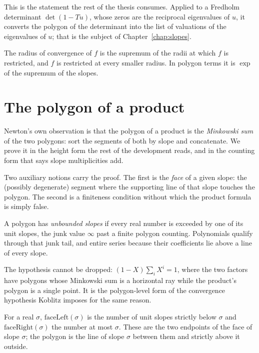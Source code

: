 This is the statement the rest of the thesis consumes.  Applied to a Fredholm determinant
$\det(1 - Tu)$, whose zeros are the reciprocal eigenvalues of $u$, it converts the polygon of the
determinant into the list of valuations of the eigenvalues of $u$; that is the subject of
Chapter~\ref{chap:slopes}.

\begin{proposition}
  \label{prop:np-radius}
  \leanok
  The radius of convergence of $f$ is the supremum of the radii at which $f$ is restricted, and
  $f$ is restricted at every smaller radius.  In polygon terms it is $\exp$ of the supremum of
  the slopes.
\end{proposition}

\section{The polygon of a product}

Newton's own observation is that the polygon of a product is the \emph{Minkowski sum} of the two
polygons: sort the segments of both by slope and concatenate.  We prove it in the height form the
rest of the development reads, and in the counting form that says slope multiplicities add.

Two auxiliary notions carry the proof.  The first is the \emph{face} of a given slope: the
(possibly degenerate) segment where the supporting line of that slope touches the polygon.  The
second is a finiteness condition without which the product formula is simply false.

\begin{definition}
  \label{def:slopesunbounded}
  \leanok
  A polygon has \emph{unbounded slopes} if every real number is exceeded by one of its unit
  slopes, the junk value $\infty$ past a finite polygon counting.  Polynomials qualify through
  that junk tail, and entire series because their coefficients lie above a line of every slope.
\end{definition}

The hypothesis cannot be dropped: $(1 - X)\sum_i X^i = 1$, where the two factors have polygons
whose Minkowski sum is a horizontal ray while the product's polygon is a single point.  It is the
polygon-level form of the convergence hypothesis Koblitz imposes for the same reason.

\begin{definition}
  \label{def:face}
  \leanok
  For a real $\sigma$, $\mathrm{faceLeft}(\sigma)$ is the number of unit slopes strictly below
  $\sigma$ and $\mathrm{faceRight}(\sigma)$ the number at most $\sigma$.  These are the two
  endpoints of the face of slope $\sigma$; the polygon is the line of slope $\sigma$ between them
  and strictly above it outside.
\end{definition}

